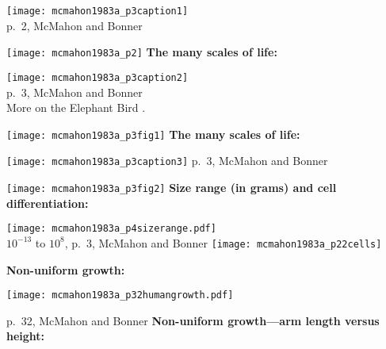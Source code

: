       \texttt{[image: mcmahon1983a\_p3caption1]}\\
      {\small p.\ 2, McMahon and Bonner\cite{mcmahon1983a}}
      
      \texttt{[image: mcmahon1983a\_p2]}
  \textbf{The many scales of life:}
    
      \texttt{[image: mcmahon1983a\_p3caption2]}\\
      \small p.\ 3, McMahon and Bonner\cite{mcmahon1983a}
      \\
      \small
      More on the Elephant Bird .
      
      \texttt{[image: mcmahon1983a\_p3fig1]}
  \textbf{The many scales of life:}
    
      \texttt{[image: mcmahon1983a\_p3caption3]}
      {\small p.\ 3, McMahon and Bonner\cite{mcmahon1983a}}
      
      \texttt{[image: mcmahon1983a\_p3fig2]}    
  \textbf{Size range (in grams) and cell differentiation:}
      
      \texttt{[image: mcmahon1983a\_p4sizerange.pdf]}\\
      {\tiny $10^{-13}$ to $10^{8}$, p.\ 3, McMahon and Bonner\cite{mcmahon1983a}}
      \texttt{[image: mcmahon1983a\_p22cells]}
  
  \textbf{Non-uniform growth:}
    \begin{center}
      \texttt{[image: mcmahon1983a\_p32humangrowth.pdf]}    
    \end{center}
  \small{p.\ 32, McMahon and Bonner\cite{mcmahon1983a}}
  \textbf{Non-uniform growth---arm length versus height:}

